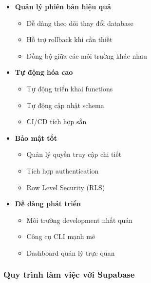 \documentclass[a4paper]{report}
\begin{document}
\begin{itemize}
    \item \textbf{Quản lý phiên bản hiệu quả}
    \begin{itemize}
        \item Dễ dàng theo dõi thay đổi database
        \item Hỗ trợ rollback khi cần thiết
        \item Đồng bộ giữa các môi trường khác nhau
    \end{itemize}

    \item \textbf{Tự động hóa cao}
    \begin{itemize}
        \item Tự động triển khai functions
        \item Tự động cập nhật schema
        \item CI/CD tích hợp sẵn
    \end{itemize}

    \item \textbf{Bảo mật tốt}
    \begin{itemize}
        \item Quản lý quyền truy cập chi tiết
        \item Tích hợp authentication
        \item Row Level Security (RLS)
    \end{itemize}

    \item \textbf{Dễ dàng phát triển}
    \begin{itemize}
        \item Môi trường development nhất quán
        \item Công cụ CLI mạnh mẽ
        \item Dashboard quản lý trực quan
    \end{itemize}
\end{itemize}

\subsubsection{Quy trình làm việc với Supabase}
\end{document}
